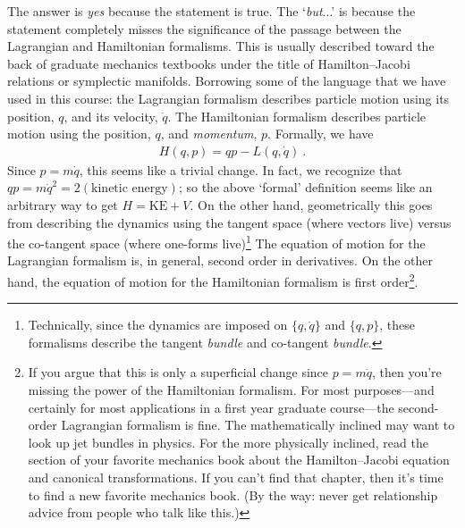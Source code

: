 The answer is \emph{yes} because the statement is true. The `\emph{but}...' is because the statement completely misses the significance of the passage between the Lagrangian and Hamiltonian formalisms. This is usually described toward the back of graduate mechanics textbooks under the title of Hamilton--Jacobi relations or symplectic manifolds. Borrowing some of the language that we have used in this course: the Lagrangian formalism describes particle motion using its position, $q$, and its velocity, $\dot q$. The Hamiltonian formalism describes particle motion using the position, $q$, and \emph{momentum}, $p$. Formally, we have
\begin{align}
	H(q,p) = qp - L(q,\dot q) \ .
\end{align}
Since $p=m\dot q$, this seems like a trivial change. In fact, we recognize that $qp = m\dot q^2 = 2 (\text{kinetic energy})$; so the above `formal' definition seems like an arbitrary way to get $H = \text{KE}+V$. On the other hand, geometrically this goes from describing the dynamics using the tangent space (where vectors live) versus the co-tangent space (where one-forms live)\footnote{Technically, since the dynamics are imposed on $\{q,\dot q\}$ and $\{q,p\}$, these formalisms describe the tangent \emph{bundle} and co-tangent \emph{bundle}.} The equation of motion for the Lagrangian formalism is, in general, second order in derivatives. On the other hand, the equation of motion for the Hamiltonian formalism is first order\footnote{If you argue that this is only a superficial change since $p=m\dot q$, then you're missing the power of the Hamiltonian formalism. For most purposes---and certainly for most applications in a first year graduate course---the second-order Lagrangian formalism is fine. The mathematically inclined may want to look up jet bundles in physics. For the more physically inclined, read the section of your favorite mechanics book about the Hamilton--Jacobi equation and canonical transformations. If you can't find that chapter, then it's time to find a new favorite mechanics book. (By the way: never get relationship advice from people who talk like this.)}.

